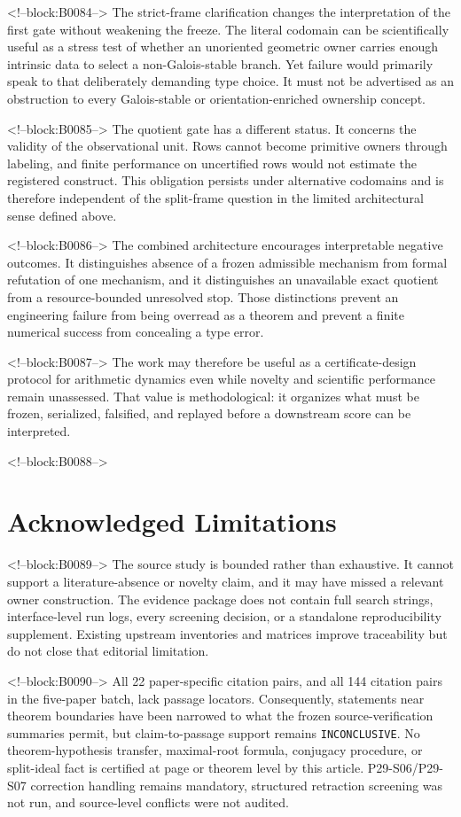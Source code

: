\documentclass[11pt,a4paper]{article}
\begin{document}
<!--block:B0084-->
The strict-frame clarification changes the interpretation of the first gate without weakening the freeze. The literal codomain can be scientifically useful as a stress test of whether an unoriented geometric owner carries enough intrinsic data to select a non-Galois-stable branch. Yet failure would primarily speak to that deliberately demanding type choice. It must not be advertised as an obstruction to every Galois-stable or orientation-enriched ownership concept.

<!--block:B0085-->
The quotient gate has a different status. It concerns the validity of the observational unit. Rows cannot become primitive owners through labeling, and finite performance on uncertified rows would not estimate the registered construct. This obligation persists under alternative codomains and is therefore independent of the split-frame question in the limited architectural sense defined above.

<!--block:B0086-->
The combined architecture encourages interpretable negative outcomes. It distinguishes absence of a frozen admissible mechanism from formal refutation of one mechanism, and it distinguishes an unavailable exact quotient from a resource-bounded unresolved stop. Those distinctions prevent an engineering failure from being overread as a theorem and prevent a finite numerical success from concealing a type error.

<!--block:B0087-->
The work may therefore be useful as a certificate-design protocol for arithmetic dynamics even while novelty and scientific performance remain unassessed. That value is methodological: it organizes what must be frozen, serialized, falsified, and replayed before a downstream score can be interpreted.

<!--block:B0088-->
\section{Acknowledged Limitations}

<!--block:B0089-->
The source study is bounded rather than exhaustive. It cannot support a literature-absence or novelty claim, and it may have missed a relevant owner construction. The evidence package does not contain full search strings, interface-level run logs, every screening decision, or a standalone reproducibility supplement. Existing upstream inventories and matrices improve traceability but do not close that editorial limitation.

<!--block:B0090-->
All 22 paper-specific citation pairs, and all 144 citation pairs in the five-paper batch, lack passage locators. Consequently, statements near theorem boundaries have been narrowed to what the frozen source-verification summaries permit, but claim-to-passage support remains \texttt{INCONCLUSIVE}. No theorem-hypothesis transfer, maximal-root formula, conjugacy procedure, or split-ideal fact is certified at page or theorem level by this article. P29-S06/P29-S07 correction handling remains mandatory, structured retraction screening was not run, and source-level conflicts were not audited.
\end{document}
